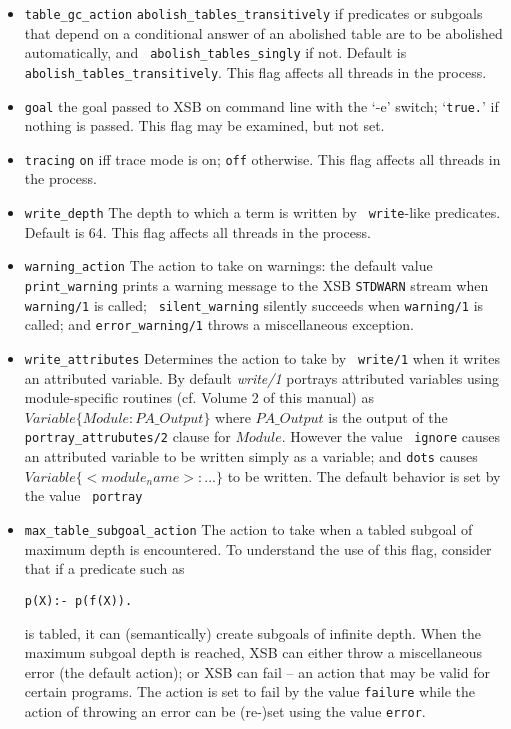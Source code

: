 \begin{description}
\begin{itemize}
%
\item {\tt table\_gc\_action}  {\tt abolish\_tables\_transitively} if
  predicates or subgoals that depend on a conditional answer of an
  abolished table are to be abolished automatically, and {\tt
    abolish\_tables\_singly} if not.  Default is {\tt
    abolish\_tables\_transitively}.  This flag affects all threads in
  the process. 
%
\item {\tt goal}  the goal passed to XSB on command line with the `-e'
switch; `{\tt true.}' if nothing is passed.  This flag may be
examined, but not set. 
%
\item {\tt tracing}  {\tt on} iff trace mode is on; {\tt off}
otherwise. This flag affects all threads in the process. 
%
\item {\tt write\_depth}  The depth to which a term is written by {\tt
  write}-like predicates.  Default is 64.  This flag affects all
threads in the process.  

\item {\tt warning\_action} The action to take on warnings: the
  default value {\tt print\_warning} prints a warning message to the
  XSB {\tt STDWARN} stream when {\tt warning/1} is called; {\tt
    silent\_warning} silently succeeds when {\tt warning/1} is called;
  and {\tt error\_warning/1} throws a miscellaneous exception.

\item {\tt write\_attributes} Determines the action to take by {\tt
  write/1} when it writes an attributed variable.  By default {\em
  write/1} portrays attributed variables using module-specific
  routines (cf. Volume 2 of this manual) as $Variable \{ Module :
  PA\_Output\}$ where $PA\_Output$ is the output of the {\tt
    portray\_attrubutes/2} clause for $Module$.  However the value {\tt
    ignore} causes an attributed variable to be written simply as a
  variable; and {\tt dots} causes $Variable \{ <module_name> : ...\}$
  to be written.  The default behavior is set by the value {\tt
    portray}

\item {\tt max\_table\_subgoal\_action} The action to take when a tabled
  subgoal of maximum depth is encountered.  To understand the use of
  this flag, consider that if a predicate such as
\begin{verbatim}
p(X):- p(f(X)).
\end{verbatim}
  is tabled, it can (semantically) create subgoals of infinite depth.
  When the maximum subgoal depth is reached, XSB can either throw a
  miscellaneous error (the default action); or XSB can fail -- an
  action that may be valid for certain programs.  The action is set to
  fail by the value {\tt failure} while the action of throwing an
  error can be (re-)set using the value {\tt error}.


\end{itemize}
\end{description}
